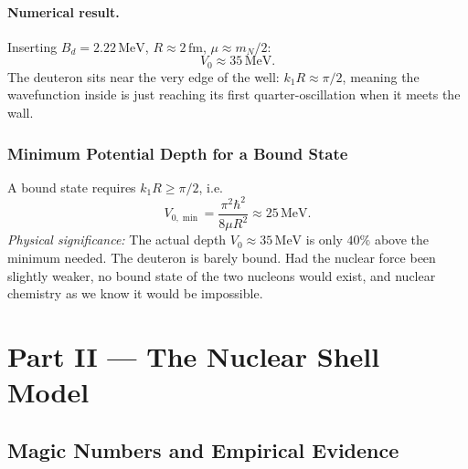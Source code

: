 \paragraph{Numerical result.}
Inserting $B_d=2.22\,\mathrm{MeV}$, $R\approx2\,\mathrm{fm}$, $\mu\approx
m_N/2$:
\begin{equation}
  \label{eq:lec04:V0}
  \boxed{V_0\approx35\,\mathrm{MeV}.}
\end{equation}
The deuteron sits near the very edge of the well: $k_1 R\approx\pi/2$,
meaning the wavefunction inside is just reaching its first quarter-oscillation
when it meets the wall.

\subsubsection*{Minimum Potential Depth for a Bound State}
A bound state requires $k_1 R\geq\pi/2$, i.e.\
\begin{equation}
  \label{eq:lec04:Vmin}
  V_{0,\min}=\frac{\pi^2\hbar^2}{8\mu R^2}\approx25\,\mathrm{MeV}.
\end{equation}
\textit{Physical significance:} The actual depth $V_0\approx35\,\mathrm{MeV}$ is only
$40\%$ above the minimum needed.  The deuteron is barely bound.  Had the nuclear
force been slightly weaker, no bound state of the two nucleons would exist, and
nuclear chemistry as we know it would be impossible.


\section{Part II — The Nuclear Shell Model}

\subsection{Magic Numbers and Empirical Evidence}

